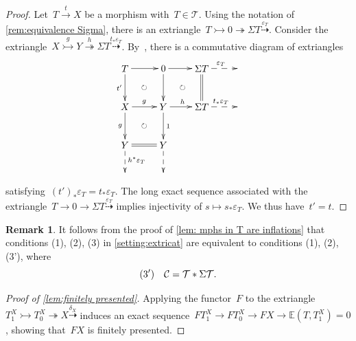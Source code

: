 \documentclass{amsart}
\theoremstyle{definition}
\newtheorem{remark}[theorem]{Remark}
\newcommand{\cat}{\mathcal{C}}
\newcommand{\susp}{\Sigma}
\newcommand{\tc}{\mathcal{T}}
\newcommand{\infl}{\rightarrowtail}
\newcommand{\defl}{\twoheadrightarrow}
\newcommand{\eps}{\varepsilon}
\begin{document}
\begin{proof}
Let~$T \overset{t}{\to} X$ be a morphism with~$T \in \tc$.
Using the notation of \cref{rem:equivalence Sigma}, there is an extriangle~$T\infl 0\defl \susp T \overset{\eps_T}{\dashrightarrow}$.
Consider the extriangle~$X\overset{g}{\infl} Y \overset{h}{\defl} \susp T \overset{t_\ast\eps_T}{\dashrightarrow}$.
By~\cite[Prop.~3.17]{NakaokaPalu}, there is a commutative diagram of extriangles
\[
\xy
(-7,7)*+{T}="2";
(7,7)*+{0}="4";
(21,7)*+{\susp T}="6";
(35,7)*+{}="8";
%
(-7,-7)*+{X}="12";
(7,-7)*+{Y}="14";
(21,-7)*+{\susp T}="16";
(35,-7)*+{}="18";
%
(-7,-21)*+{Y}="22";
(7,-21)*+{Y}="24";
%
(-7,-32)*+{}="32";
(7,-32)*+{}="34";
%
{\ar@{->} "2";"4"};
{\ar@{->} "4";"6"};
{\ar@{-->}^{\eps_T} "6";"8"};
%
{\ar@{->}_{t'} "2";"12"};
{\ar "4";"14"};
{\ar@{=} "6";"16"};
%
{\ar^{g} "12";"14"};
{\ar^{h} "14";"16"};
{\ar@{-->}^{t_\ast\eps_T} "16";"18"};
%
{\ar_{g} "12";"22"};
{\ar^{1} "14";"24"};
%
{\ar@{=} "22";"24"};
%
{\ar@{-->}^{h^\ast\eps_T} "22";"32"};
{\ar@{-->} "24";"34"};
%
{\ar@{}|\circlearrowright "2";"14"};
{\ar@{}|\circlearrowright "4";"16"};
{\ar@{}|\circlearrowright "12";"24"};
\endxy
\]
satisfying~$(t')_\ast\eps_T=t_\ast\eps_T$.
The long exact sequence associated with the extriangle~$T\to 0 \to \Sigma T \overset{\eps_T}{\dashrightarrow}$ implies injectivity of $s\mapsto s_\ast\eps_T$.
We thus have~$t'=t$.
\end{proof}

\begin{remark}
It follows from the proof of \cref{lem: mphs in T are inflations} that conditions (1), (2), (3) in \cref{setting:extricat} are equivalent to conditions (1), (2), (3'), where
\[
{\rm (3')} \quad \cat = \tc\ast\susp\tc.
\]
\end{remark}

\begin{proof}[Proof of \cref{lem:finitely presented}]
Applying the functor~$F$ to the extriangle~$T_1^X\infl T_0^X\defl X\overset{\delta_X}{\dashrightarrow}$ induces an exact sequence~$FT_1^X \to FT_0^X \to FX \to \mathbb{E}(T,T_1^X)=0$, showing that~$FX$ is finitely presented.
\end{proof}
\end{document}
